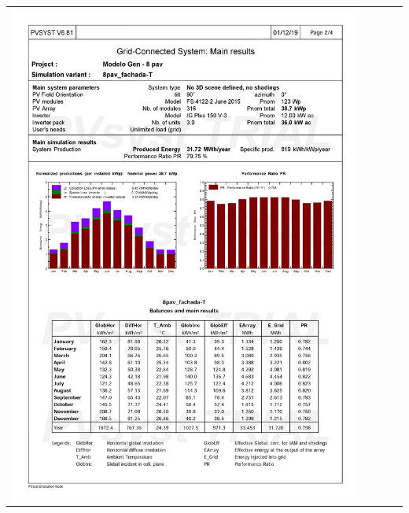 \begin{table}[H]
    \centering
    \begin{tabular}{l}
        \includegraphics[width=0.9\textwidth]{figures/attachments/resultpv12.jpg}
    \end{tabular}
\end{table}
\pagebreak
